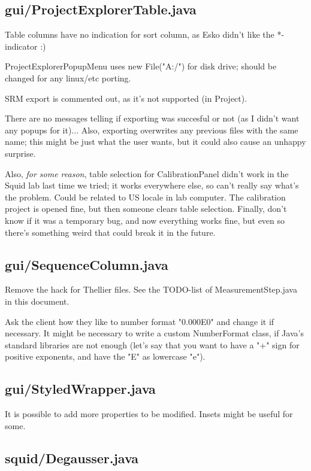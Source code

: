 \subsection{gui/ProjectExplorerTable.java}

Table columns have no indication for sort column, as Esko didn't like the *-indicator :)
	    
ProjectExplorerPopupMenu uses new File("A:/") for disk drive; should be changed for any linux/etc porting.

SRM export is commented out, as it's not supported (in Project).

There are no messages telling if exporting was succesful or not (as I didn't want any popups for it)... Also, exporting overwrites any previous files with the same name; this might be just what the user wants, but it could also cause an unhappy surprise.

Also, \textit{for some reason}, table selection for CalibrationPanel didn't work in the Squid lab last time we tried; it works everywhere else, so can't really say what's the problem. Could be related to US locale in lab computer. The calibration project is opened fine, but then someone clears table selection. Finally, don't know if it was a temporary bug, and now everything works fine, but even so there's something weird that could break it in the future.


\subsection{gui/SequenceColumn.java}

Remove the hack for Thellier files. See the TODO-list of MeasurementStep.java in this document.

Ask the client how they like to number format "0.000E0" and change it if necessary. It might be necessary to write a custom NumberFormat class, if Java's standard libraries are not enough (let's say that you want to have a "+" sign for positive exponents, and have the "E" as lowercase "e").


\subsection{gui/StyledWrapper.java}

It is possible to add more properties to be modified. Insets might be useful for some.


\subsection{squid/Degausser.java}

